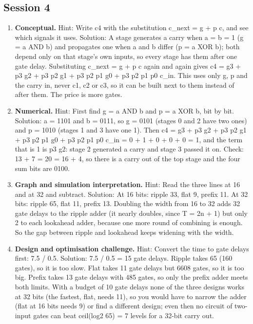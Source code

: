 \documentclass[11pt,a4paper]{article}
\begin{document}
\subsection*{Session 4}
\begin{enumerate}[nosep]
\item \textbf{Conceptual.} Hint: Write c4 with the substitution c\_next = g + p c, and see which signals it uses. Solution: A stage generates a carry when a = b = 1 (g = a AND b) and propagates one when a and b differ (p = a XOR b); both depend only on that stage's own inputs, so every stage has them after one gate delay. Substituting c\_next = g + p c again and again gives c4 = g3 + p3 g2 + p3 p2 g1 + p3 p2 p1 g0 + p3 p2 p1 p0 c\_in. This uses only g, p and the carry in, never c1, c2 or c3, so it can be built next to them instead of after them. The price is more gates.
\item \textbf{Numerical.} Hint: First find g = a AND b and p = a XOR b, bit by bit. Solution: a = 1101 and b = 0111, so g = 0101 (stages 0 and 2 have two ones) and p = 1010 (stages 1 and 3 have one 1). Then c4 = g3 + p3 g2 + p3 p2 g1 + p3 p2 p1 g0 + p3 p2 p1 p0 c\_in = 0 + 1 + 0 + 0 + 0 = 1, and the term that is 1 is p3 g2: stage 2 generated a carry and stage 3 passed it on. Check: 13 + 7 = 20 = 16 + 4, so there is a carry out of the top stage and the four sum bits are 0100.
\item \textbf{Graph and simulation interpretation.} Hint: Read the three lines at 16 and at 32 and subtract. Solution: At 16 bits: ripple 33, flat 9, prefix 11. At 32 bits: ripple 65, flat 11, prefix 13. Doubling the width from 16 to 32 adds 32 gate delays to the ripple adder (it nearly doubles, since T = 2n + 1) but only 2 to each lookahead adder, because one more round of combining is enough. So the gap between ripple and lookahead keeps widening with the width.
\item \textbf{Design and optimisation challenge.} Hint: Convert the time to gate delays first: 7.5 / 0.5. Solution: 7.5 / 0.5 = 15 gate delays. Ripple takes 65 (160 gates), so it is too slow. Flat takes 11 gate delays but 6608 gates, so it is too big. Prefix takes 13 gate delays with 485 gates, so only the prefix adder meets both limits. With a budget of 10 gate delays none of the three designs works at 32 bits (the fastest, flat, needs 11), so you would have to narrow the adder (flat at 16 bits needs 9) or find a different design; even then no circuit of two-input gates can beat ceil(log2 65) = 7 levels for a 32-bit carry out.
\end{enumerate}
\end{document}
